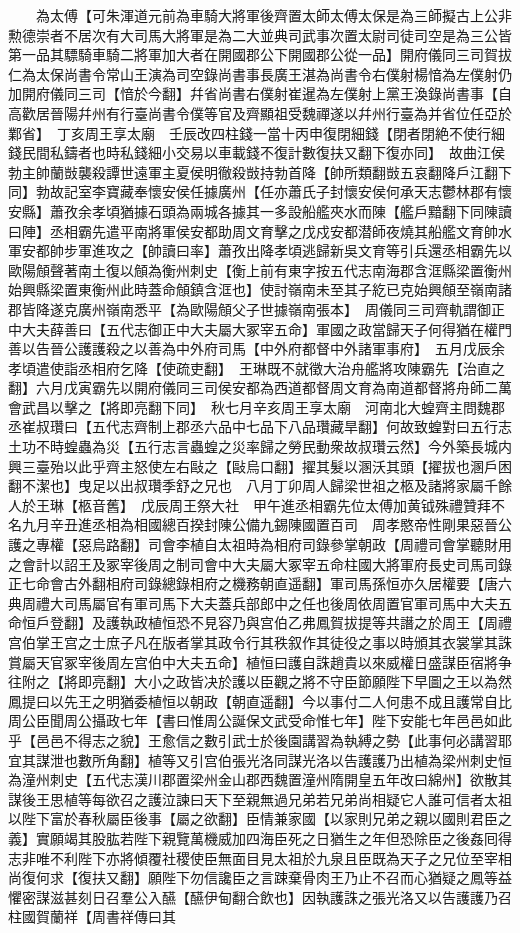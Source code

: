 　　為太傅【可朱渾道元前為車騎大將軍後齊置太師太傅太保是為三師擬古上公非勲德崇者不居次有大司馬大將軍是為二大並典司武事次置太尉司徒司空是為三公皆第一品其驃騎車騎二將軍加大者在開國郡公下開國郡公從一品】開府儀同三司賀拔仁為太保尚書令常山王演為司空錄尚書事長廣王湛為尚書令右僕射楊愔為左僕射仍加開府儀同三司【愔於今翻】幷省尚書右僕射崔暹為左僕射上黨王渙錄尚書事【自高歡居晉陽幷州有行臺尚書令僕等官及齊顯祖受魏禪遂以幷州行臺為并省位任亞於鄴省】　丁亥周王享太廟　壬辰改四柱錢一當十丙申復閉細錢【閉者閉絶不使行細錢民間私鑄者也時私錢細小交易以車載錢不復計數復扶又翻下復亦同】　故曲江侯勃主帥蘭敱襲殺譚世遠軍主夏侯明徹殺敱持勃首降【帥所類翻敱五哀翻降戶江翻下同】勃故記室李寶藏奉懷安侯任據廣州【任亦蕭氏子封懷安侯何承天志鬱林郡有懷安縣】蕭孜余孝頃猶據石頭為兩城各據其一多設船艦夾水而陳【艦戶黯翻下同陳讀曰陣】丞相霸先遣平南將軍侯安都助周文育擊之戊戍安都潜師夜燒其船艦文育帥水軍安都帥步軍進攻之【帥讀曰率】蕭孜出降孝頃逃歸新吳文育等引兵還丞相霸先以歐陽頠聲著南土復以頠為衡州刺史【衡上前有東字按五代志南海郡含洭縣梁置衡州始興縣梁置東衡州此時蓋命頠鎮含洭也】使討嶺南未至其子紇已克始興頠至嶺南諸郡皆降遂克廣州嶺南悉平【為歐陽頠父子世據嶺南張本】　周儀同三司齊軌謂御正中大夫薛善曰【五代志御正中大夫屬大冢宰五命】軍國之政當歸天子何得猶在權門善以告晉公護護殺之以善為中外府司馬【中外府都督中外諸軍事府】　五月戊辰余孝頃遣使詣丞相府乞降【使疏吏翻】　王琳既不就徵大治舟艦將攻陳霸先【治直之翻】六月戊寅霸先以開府儀同三司侯安都為西道都督周文育為南道都督將舟師二萬會武昌以擊之【將即亮翻下同】　秋七月辛亥周王享太廟　河南北大蝗齊主問魏郡丞崔叔瓚曰【五代志齊制上郡丞六品中七品下八品瓚藏旱翻】何故致蝗對曰五行志土功不時蝗蟲為災【五行志言蟲蝗之災率歸之勞民動衆故叔瓚云然】今外築長城内興三臺殆以此乎齊主怒使左右敺之【敺烏口翻】擢其髮以溷沃其頭【擢拔也溷戶困翻不潔也】曳足以出叔瓚季舒之兄也　八月丁卯周人歸梁世祖之柩及諸將家屬千餘人於王琳【柩音舊】　戊辰周王祭大社　甲午進丞相霸先位太傅加黄钺殊禮贊拜不名九月辛丑進丞相為相國總百揆封陳公備九錫陳國置百司　周孝愍帝性剛果惡晉公護之專權【惡烏路翻】司會李植自太祖時為相府司錄參掌朝政【周禮司會掌聽財用之會計以詔王及冢宰後周之制司會中大夫屬大冢宰五命柱國大將軍府長史司馬司錄正七命會古外翻相府司錄總錄相府之機務朝直遥翻】軍司馬孫恒亦久居權要【唐六典周禮大司馬屬官有軍司馬下大夫蓋兵部郎中之任也後周依周置官軍司馬中大夫五命恒戶登翻】及護執政植恒恐不見容乃與宫伯乙弗鳳賀拔提等共譖之於周王【周禮宫伯掌王宫之士庶子凡在版者掌其政令行其秩叙作其徒役之事以時頒其衣裳掌其誅賞屬天官冢宰後周左宫伯中大夫五命】植恒曰護自誅趙貴以來威權日盛謀臣宿將争往附之【將即亮翻】大小之政皆决於護以臣觀之將不守臣節願陛下早圖之王以為然鳳提曰以先王之明猶委植恒以朝政【朝直遥翻】今以事付二人何患不成且護常自比周公臣聞周公攝政七年【書曰惟周公誕保文武受命惟七年】陛下安能七年邑邑如此乎【邑邑不得志之貌】王愈信之數引武士於後園講習為執縛之勢【此事何必講習耶宜其謀泄也數所角翻】植等又引宫伯張光洛同謀光洛以告護護乃出植為梁州刺史恒為潼州刺史【五代志漢川郡置梁州金山郡西魏置潼州隋開皇五年改曰綿州】欲散其謀後王思植等每欲召之護泣諫曰天下至親無過兄弟若兄弟尚相疑它人誰可信者太祖以陛下富於春秋屬臣後事【屬之欲翻】臣情兼家國【以家則兄弟之親以國則君臣之義】實願竭其股肱若陛下親覽萬機威加四海臣死之日猶生之年但恐除臣之後姦囘得志非唯不利陛下亦將傾覆社稷使臣無面目見太祖於九泉且臣既為天子之兄位至宰相尚復何求【復扶又翻】願陛下勿信讒臣之言踈棄骨肉王乃止不召而心猶疑之鳳等益懼密謀滋甚刻日召羣公入醼【醼伊甸翻合飲也】因執護誅之張光洛又以告護護乃召柱國賀蘭祥【周書祥傳曰其